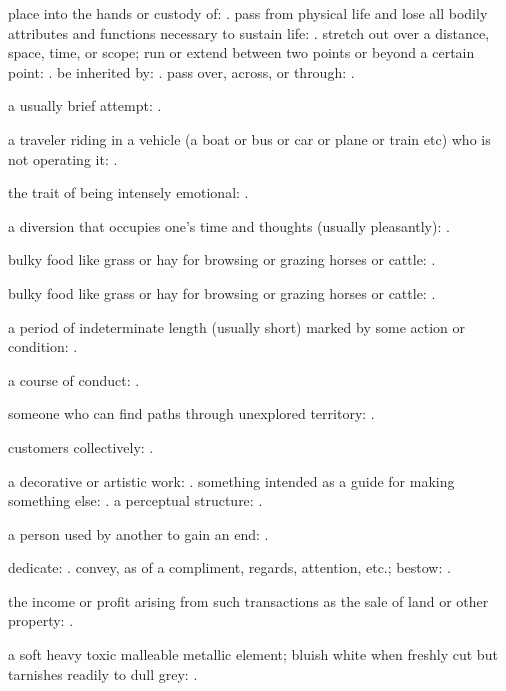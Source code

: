   place into the hands or custody of: . pass from physical life and lose all bodily attributes and functions necessary to sustain life: . stretch out over a distance, space, time, or scope; run or extend between two points or beyond a certain point: . be inherited by: . pass over, across, or through: .

  a usually brief attempt: .

  a traveler riding in a vehicle (a boat or bus or car or plane or train etc) who is not operating it: .

  the trait of being intensely emotional: .

  a diversion that occupies one's time and thoughts (usually pleasantly): .

  bulky food like grass or hay for browsing or grazing horses or cattle: .

  bulky food like grass or hay for browsing or grazing horses or cattle: .

  a period of indeterminate length (usually short) marked by some action or condition: .

  a course of conduct: .

  someone who can find paths through unexplored territory: .

  customers collectively: .

  a decorative or artistic work: . something intended as a guide for making something else: . a perceptual structure: .

  a person used by another to gain an end: .

  dedicate: . convey, as of a compliment, regards, attention, etc.; bestow: .

  the income or profit arising from such transactions as the sale of land or other property: .

  a soft heavy toxic malleable metallic element; bluish white when freshly cut but tarnishes readily to dull grey: .

